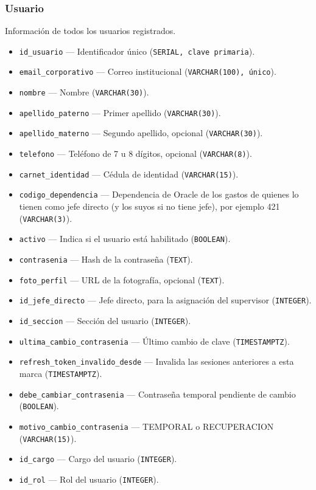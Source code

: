 \documentclass[11pt,letterpaper]{article}
\newcommand{\code}[1]{\nolinkurl{#1}}
\newcommand{\campo}[3]{\item \code{#1} --- #2 (\texttt{#3}).}
\begin{document}
\subsubsection{Usuario}
Información de todos los usuarios registrados.
\begin{itemize}
  \campo{id_usuario}{Identificador único}{SERIAL, clave primaria}
  \campo{email_corporativo}{Correo institucional}{VARCHAR(100), único}
  \campo{nombre}{Nombre}{VARCHAR(30)}
  \campo{apellido_paterno}{Primer apellido}{VARCHAR(30)}
  \campo{apellido_materno}{Segundo apellido, opcional}{VARCHAR(30)}
  \campo{telefono}{Teléfono de 7 u 8 dígitos, opcional}{VARCHAR(8)}
  \campo{carnet_identidad}{Cédula de identidad}{VARCHAR(15)}
  \campo{codigo_dependencia}{Dependencia de Oracle de los gastos de quienes lo tienen como jefe directo (y los suyos si no tiene jefe), por ejemplo 421}{VARCHAR(3)}
  \campo{activo}{Indica si el usuario está habilitado}{BOOLEAN}
  \campo{contrasenia}{Hash de la contraseña}{TEXT}
  \campo{foto_perfil}{URL de la fotografía, opcional}{TEXT}
  \campo{id_jefe_directo}{Jefe directo, para la asignación del supervisor}{INTEGER}
  \campo{id_seccion}{Sección del usuario}{INTEGER}
  \campo{ultima_cambio_contrasenia}{Último cambio de clave}{TIMESTAMPTZ}
  \campo{refresh_token_invalido_desde}{Invalida las sesiones anteriores a esta marca}{TIMESTAMPTZ}
  \campo{debe_cambiar_contrasenia}{Contraseña temporal pendiente de cambio}{BOOLEAN}
  \campo{motivo_cambio_contrasenia}{TEMPORAL o RECUPERACION}{VARCHAR(15)}
  \campo{id_cargo}{Cargo del usuario}{INTEGER}
  \campo{id_rol}{Rol del usuario}{INTEGER}
\end{itemize}
\end{document}
